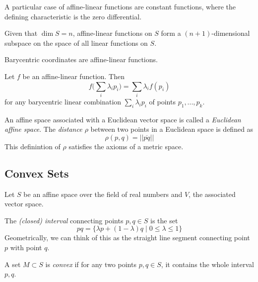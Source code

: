 \documentclass{article}
\begin{document}
    A particular case of affine-linear functions are constant functions, where the defining characteristic is the zero differential. 

    \begin{proposition}
    Given that $\dim{S} = n$, affine-linear functions on $S$ form a $(n+1)$-dimensional subspace on the space of all linear functions on $S$. 
    \end{proposition}

    \begin{proposition}
    Barycentric coordinates are affine-linear functions. 
    \end{proposition}

    \begin{proposition}
    Let $f$ be an affine-linear function. Then
    \[f \bigg( \sum_i \lambda_i p_i \bigg) = \sum_i \lambda_i f(p_i)\]
    for any barycentric linear combination $\sum_i \lambda_i p_i$ of points $p_1, ..., p_k$. 
    \end{proposition}

    \begin{definition}
    An affine space associated with a Euclidean vector space is called a \textit{Euclidean affine space}. The \textit{distance $\rho$} between two points in a Euclidean space is defined as
    \[\rho(p, q) = ||\overline{pq}||\]
    This definintion of $\rho$ satisfies the axioms of a metric space. 
    \end{definition}

  \subsection{Convex Sets}

    Let $S$ be an affine space over the field of real numbers and $V$, the associated vector space. 

    \begin{definition}
    The \textit{(closed) interval} connecting points $p, q \in S$ is the set
    \[pq = \{\lambda p + (1-\lambda) q \;|\; 0 \leq \lambda \leq 1\}\]
    Geometrically, we can think of this as the straight line segment connecting point $p$ with point $q$. 
    \end{definition}

    \begin{definition}
    A set $M \subset S$ is \textit{convex} if for any two points $p, q \in S$, it contains the whole interval $p, q$. 
    \end{definition}
\end{document}
